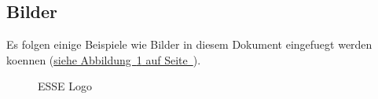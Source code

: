 \documentclass[12pt,a4paper,titlepage,oneside]{scrartcl}
\begin{document}
\subsection{Bilder}

Es folgen einige Beispiele wie Bilder in diesem Dokument eingefuegt werden koennen
(\hyperref[fig:logo1]{siehe Abbildung~\ref*{fig:logo1} auf Seite~\pageref*{fig:logo1}}).

\begin{figure}[h!]
  \centering
  \caption{ESSE Logo}
  \label{fig:logo1}
\end{figure}


%
%
\end{document}

